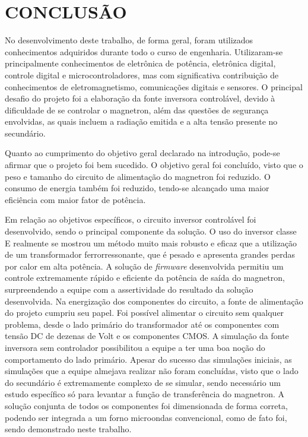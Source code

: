 \chapter{CONCLUSÃO}
\label{chap:conclusao}


No desenvolvimento deste trabalho, de forma geral, foram utilizados conhecimentos adquiridos durante todo o curso de engenharia. Utilizaram-se principalmente conhecimentos de eletrônica de potência, eletrônica digital, controle digital e microcontroladores, mas com significativa contribuição de conhecimentos de eletromagnetismo, comunicações digitais e  sensores. O principal desafio do projeto foi a elaboração da fonte inversora controlável, devido à dificuldade de se controlar o magnetron, além das questões de segurança envolvidas, as quais incluem a radiação emitida e a alta tensão presente no secundário.

Quanto ao cumprimento do objetivo geral declarado na introdução, pode-se afirmar que o projeto foi bem sucedido. O objetivo geral foi concluído, visto que o peso e tamanho do circuito de alimentação do magnetron foi reduzido. O consumo de energia também foi reduzido, tendo-se alcançado uma maior eficiência com maior fator de potência. 

Em relação ao objetivos específicos, o circuito inversor controlável foi desenvolvido, sendo o principal componente da solução. O uso do inversor classe E realmente se mostrou um método muito mais robusto e eficaz que a utilização de um transformador ferrorressonante, que é pesado e apresenta grandes perdas por calor em alta potência. A solução de \textit{firmware} desenvolvida  permitiu um controle extremamente rápido e eficiente da potência de saída do magnetron, surpreendendo a equipe com a assertividade do resultado da solução desenvolvida. Na energização dos componentes do circuito, a fonte de alimentação do projeto cumpriu seu papel. Foi possível alimentar o circuito sem qualquer problema, desde o lado primário do transformador até os componentes com tensão DC de dezenas de Volt e os componentes CMOS. A simulação da fonte inversora sem controlador possibilitou a equipe a ter uma boa noção do comportamento do lado primário. Apesar do sucesso das simulações iniciais, as simulações que a equipe almejava realizar não foram concluídas, visto que o lado do secundário é extremamente complexo de se simular, sendo necessário um estudo específico só para levantar a função de transferência do magnetron. A solução conjunta de todos os componentes foi dimensionada de forma correta, podendo ser integrada a um forno microondas convencional, como de fato foi, sendo demonstrado neste trabalho.


